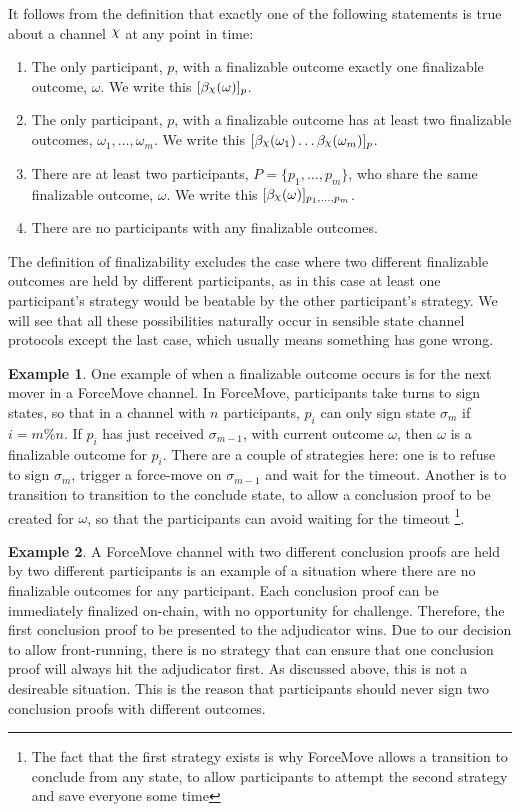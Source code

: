 \documentclass{article}
\DeclareRobustCommand{\rchi}{{\mathpalette\irchi\relax}}
\newcommand{\irchi}[2]{\raisebox{\depth}{$#1\chi$}} %
\theoremstyle{definition}
\newtheorem{example}{Example}[section]
\newcommand{\enf}[1]{[#1]}
\begin{document}
It follows from the definition that exactly one of the following statements is true about
a channel $\rchi$ at any point in time:
\begin{enumerate}
  \item The only participant, $p$, with a finalizable outcome exactly
        one finalizable outcome, $\omega$. We write this $\enf{\beta_\rchi(\omega)}_p$.
  \item The only participant, $p$, with a finalizable outcome has at least
        two finalizable outcomes, $\omega_1, \dots, \omega_m$.
        We write this $\enf{\beta_\rchi(\omega_1) \dots \beta_\rchi(\omega_m)}_p$.
  \item There are at least two participants, $P = \{p_1, \dots, p_m \}$, who share the same
        finalizable outcome, $\omega$. We write this $\enf{\beta_\rchi(\omega)}_{p_1, \dots, p_m}$.
  \item There are no participants with any finalizable outcomes.
\end{enumerate}
The definition of finalizability excludes the case where two different finalizable outcomes are held
by different participants, as in this case at least one participant's strategy would be beatable
by the other participant's strategy.
We will see that all these possibilities naturally occur in sensible state channel protocols
except the last case, which usually means something has gone wrong.

\begin{example}
One example of when a finalizable outcome occurs is for the next mover in a ForceMove channel.
In ForceMove, participants take turns to sign states, so that in a channel with $n$ participants,
$p_i$ can only sign state $\sigma_m$ if $i = m \% n$.
If $p_i$ has just received $\sigma_{m-1}$, with current outcome $\omega$, then $\omega$
is a finalizable outcome for $p_i$.
There are a couple of strategies here: one is to refuse to sign $\sigma_m$, trigger a force-move
on $\sigma_{m-1}$ and wait for the timeout. 
Another is to transition to transition to the conclude state, to allow a conclusion proof
to be created for $\omega$, so that the participants can avoid waiting for the timeout
\footnote{The fact that the first strategy exists is why ForceMove allows a transition to
conclude from any state, to allow participants to attempt the second strategy and save everyone some time}.
\end{example}

\begin{example}
A ForceMove channel with two different conclusion proofs are held by two different participants
is an example of a situation where there are no finalizable outcomes for any participant.
Each conclusion proof can be immediately finalized on-chain, with no opportunity for challenge.
Therefore, the first conclusion proof to be presented to the adjudicator wins. 
Due to our decision to allow front-running, there is no strategy that can ensure that one
conclusion proof will always hit the adjudicator first.
As discussed above, this is not a desireable situation.
This is the reason that participants should never sign two conclusion proofs
with different outcomes.
\end{example}
\end{document}
